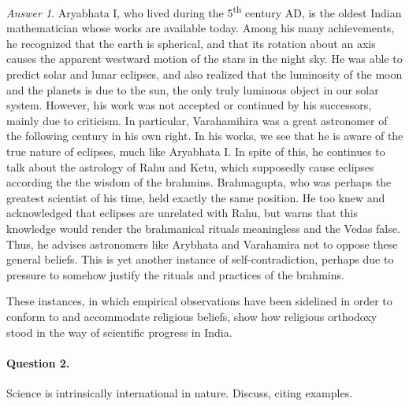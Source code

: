 \documentclass[11pt]{article}
\theoremstyle{remark}
\newtheorem*{answer}{Answer}
\begin{document}
\begin{answer}
        Aryabhata I, who lived during the 5\textsuperscript{th} century AD, is the
        oldest Indian mathematician whose works are available today. Among his many
        achievements, he recognized that the earth is spherical, and that its
        rotation about an axis causes the apparent westward motion of the stars in
        the night sky. He was able to predict solar and lunar eclipses, and also
        realized that the luminosity of the moon and the planets is due to the sun,
        the only truly luminous object in our solar system. However, his work was not
        accepted or continued by his successors, mainly due to criticism. In
        particular, Varahamihira was a great astronomer of the following century in
        his own right. In his works, we see that he is aware of the true nature of
        eclipses, much like Aryabhata I. In spite of this, he continues to talk about
        the astrology of Rahu and Ketu, which supposedly cause eclipses according the
        the wisdom of the brahmins. Brahmagupta, who was perhaps the greatest
        scientist of his time, held exactly the same position. He too knew and
        acknowledged that eclipses are unrelated with Rahu, but warns that this
        knowledge would render the brahmanical rituals meaningless and the Vedas
        false. Thus, he advises astronomers like Arybhata and Varahamira not to
        oppose these general beliefs. This is yet another instance of
        self-contradiction, perhaps due to pressure to somehow justify the rituals
        and practices of the brahmins.

        These instances, in which empirical observations have been sidelined in order
        to conform to and accommodate religious beliefs, show how religious orthodoxy
        stood in the way of scientific progress in India.
    \end{answer}

    \paragraph{Question 2.} Science is intrinsically international in nature.
    Discuss, citing examples.
\end{document}

